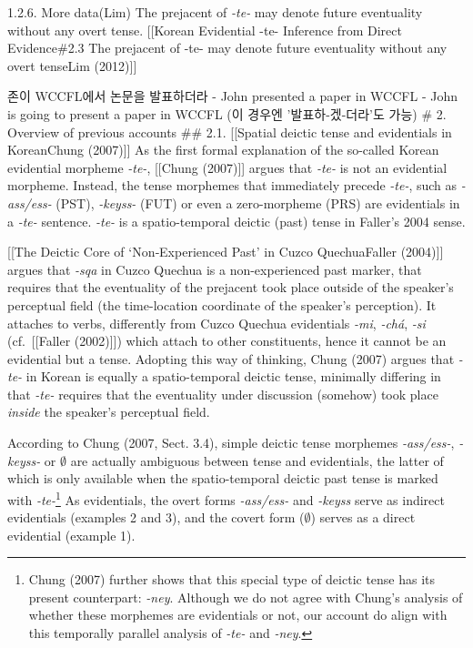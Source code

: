 1.2.6. More data(Lim) The prejacent of \emph{-te-} may denote future
eventuality without any overt tense. {[}{[}Korean Evidential -te-
Inference from Direct Evidence\#2.3 The prejacent of -te- may denote
future eventuality without any overt tense\textbar Lim (2012){]}{]}

존이 WCCFL에서 논문을 발표하더라 - John presented a paper in WCCFL -
John is going to present a paper in WCCFL (이 경우엔 '발표하-겠-더라'도
가능) \# 2. Overview of previous accounts \#\# 2.1. {[}{[}Spatial
deictic tense and evidentials in Korean\textbar Chung (2007){]}{]} As
the first formal explanation of the so-called Korean evidential morpheme
\emph{-te-}, {[}{[}Chung (2007){]}{]} argues that \emph{-te-} is not an
evidential morpheme. Instead, the tense morphemes that immediately
precede \emph{-te-}, such as \emph{-ass/ess-} (PST), \emph{-keyss-}
(FUT) or even a zero-morpheme (PRS) are evidentials in a \emph{-te-}
sentence. \emph{-te-} is a spatio-temporal deictic (past) tense in
Faller's 2004 sense.

{[}{[}The Deictic Core of `Non‐Experienced Past' in Cuzco
Quechua\textbar Faller (2004){]}{]} argues that \emph{-sqa} in Cuzco
Quechua is a non-experienced past marker, that requires that the
eventuality of the prejacent took place outside of the speaker's
perceptual field (the time-location coordinate of the speaker's
perception). It attaches to verbs, differently from Cuzco Quechua
evidentials \emph{-mi}, \emph{-chá}, \emph{-si} (cf.~{[}{[}Faller
(2002){]}{]}) which attach to other constituents, hence it cannot be an
evidential but a tense. Adopting this way of thinking, Chung (2007)
argues that \emph{-te-} in Korean is equally a spatio-temporal deictic
tense, minimally differing in that \emph{-te-} requires that the
eventuality under discussion (somehow) took place \emph{inside} the
speaker's perceptual field.

According to Chung (2007, Sect. 3.4), simple deictic tense morphemes
\emph{-ass/ess-}, \emph{-keyss-} or \(\emptyset\) are actually ambiguous
between tense and evidentials, the latter of which is only available
when the spatio-temporal deictic past tense is marked with
\emph{-te-}\footnote{Chung (2007) further shows that this special type
  of deictic tense has its present counterpart: \emph{-ney}. Although we
  do not agree with Chung's analysis of whether these morphemes are
  evidentials or not, our account do align with this temporally parallel
  analysis of \emph{-te-} and \emph{-ney}.} As evidentials, the overt
forms \emph{-ass/ess-} and \emph{-keyss} serve as indirect evidentials
(examples 2 and 3), and the covert form (\(\emptyset\)) serves as a
direct evidential (example 1).

